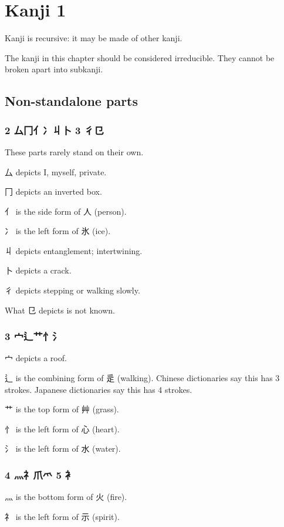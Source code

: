 \chapter{Kanji 1}

Kanji is recursive: it may be made of other kanji.

The kanji in this chapter should be considered irreducible.
They cannot be broken apart into subkanji.

\section{Non-standalone parts}

\subsection{2 厶冂亻冫丩卜 3 彳㔾}

These parts rarely stand on their own.

厶 depicts I, myself, private.

冂 depicts an inverted box.

亻 is the side form of 人 (person).

冫 is the left form of 氷 (ice).

丩 depicts entanglement; intertwining.

卜 depicts a crack.

彳 depicts stepping or walking slowly.

What 㔾 depicts is not known.

\subsection{3 宀辶艹忄氵}

宀 depicts a roof.

辶 is the combining form of 辵 (walking).
Chinese dictionaries say this has 3 strokes.
Japanese dictionaries say this has 4 strokes.

艹 is the top form of 艸 (grass).

忄 is the left form of 心 (heart).

氵 is the left form of 水 (water).

\subsection{4 灬礻爪爫 5 衤}

灬 is the bottom form of 火 (fire).

礻 is the left form of 示 (spirit).

